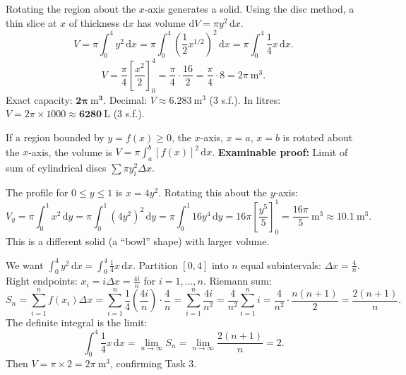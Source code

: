 \documentclass[11pt]{article}
\newcommand{\cle}[1]{{\popxbold\color{popdark}#1}}
\begin{document}
\begin{exoresolu}
Rotating the region about the $x$-axis generates a solid. Using the \cle{disc method}, a thin slice at $x$ of thickness $\mathrm{d}x$ has volume $\mathrm{d}V = \pi y^2\,\mathrm{d}x$.
\[
V = \pi \int_{0}^{4} y^2\,\mathrm{d}x = \pi \int_{0}^{4} \left( \frac{1}{2}x^{1/2} \right)^2\,\mathrm{d}x = \pi \int_{0}^{4} \frac{1}{4}x\,\mathrm{d}x.
\]
\[
V = \frac{\pi}{4} \left[ \frac{x^2}{2} \right]_{0}^{4} = \frac{\pi}{4} \cdot \frac{16}{2} = \frac{\pi}{4} \cdot 8 = 2\pi\ \mathrm{m}^3.
\]
Exact capacity: $\boldsymbol{2\pi\ \mathrm{m}^3}$.
Decimal: $V \approx 6.283\ \mathrm{m}^3$ (3 s.f.).
In litres: $V = 2\pi \times 1000 \approx \boldsymbol{6280\ \mathrm{L}}$ (3 s.f.).
\end{exoresolu}

\begin{propriete}
If a region bounded by $y=f(x)\ge 0$, the $x$-axis, $x=a$, $x=b$ is rotated about the $x$-axis, the volume is $V = \pi \int_a^b [f(x)]^2\,\mathrm{d}x$. \textbf{Examinable proof:} Limit of sum of cylindrical discs $\sum \pi y_i^2 \Delta x$.
\end{propriete}

\begin{exoresolu}
The profile for $0\le y\le 1$ is $x = 4y^2$. Rotating this about the $y$-axis:
\[
V_y = \pi \int_{0}^{1} x^2\,\mathrm{d}y = \pi \int_{0}^{1} (4y^2)^2\,\mathrm{d}y = \pi \int_{0}^{1} 16y^4\,\mathrm{d}y = 16\pi \left[ \frac{y^5}{5} \right]_0^1 = \frac{16\pi}{5}\ \mathrm{m}^3 \approx 10.1\ \mathrm{m}^3.
\]
This is a different solid (a ``bowl'' shape) with larger volume.
\end{exoresolu}

\begin{exoresolu}
We want $\int_0^4 y^2\,\mathrm{d}x = \int_0^4 \frac{1}{4}x\,\mathrm{d}x$. Partition $[0,4]$ into $n$ equal subintervals: $\Delta x = \frac{4}{n}$. Right endpoints: $x_i = i\Delta x = \frac{4i}{n}$ for $i=1,\dots,n$.
Riemann sum:
\[
S_n = \sum_{i=1}^n f(x_i)\Delta x = \sum_{i=1}^n \frac{1}{4}\left(\frac{4i}{n}\right) \cdot \frac{4}{n} = \sum_{i=1}^n \frac{4i}{n^2} = \frac{4}{n^2}\sum_{i=1}^n i = \frac{4}{n^2}\cdot\frac{n(n+1)}{2} = \frac{2(n+1)}{n}.
\]
The definite integral is the limit:
\[
\int_0^4 \frac{1}{4}x\,\mathrm{d}x = \lim_{n\to\infty} S_n = \lim_{n\to\infty} \frac{2(n+1)}{n} = 2.
\]
Then $V = \pi \times 2 = 2\pi\ \mathrm{m}^3$, confirming Task 3.
\end{exoresolu}
\end{document}
